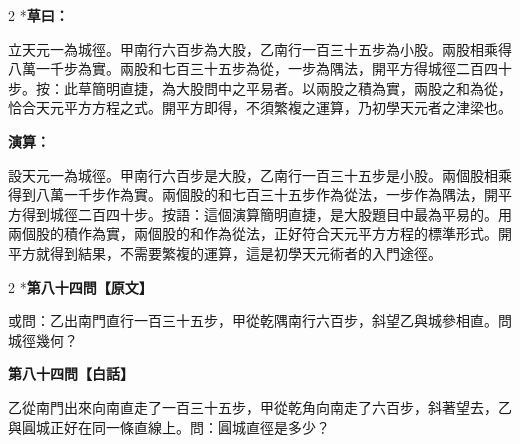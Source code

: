 \documentclass[11pt,a4paper]{article}
\begin{document}
\vspace{0.1cm}
\noindent{}
\par\vspace{0.15cm}

\begin{paracol}{2}
\switchcolumn[0]*\textbf{草曰：}

\small 立天元一為城徑。甲南行六百步為大股，乙南行一百三十五步為小股。兩股相乘得八萬一千步為實。兩股和七百三十五步為從，一步為隅法，開平方得城徑二百四十步。按：此草簡明直捷，為大股問中之平易者。以兩股之積為實，兩股之和為從，恰合天元平方方程之式。開平方即得，不須繁複之運算，乃初學天元者之津梁也。

\switchcolumn\textbf{演算：}

\small 設天元一為城徑。甲南行六百步是大股，乙南行一百三十五步是小股。兩個股相乘得到八萬一千步作為實。兩個股的和七百三十五步作為從法，一步作為隅法，開平方得到城徑二百四十步。按語：這個演算簡明直捷，是大股題目中最為平易的。用兩個股的積作為實，兩個股的和作為從法，正好符合天元平方方程的標準形式。開平方就得到結果，不需要繁複的運算，這是初學天元術者的入門途徑。
\end{paracol}

\vspace{0.1cm}
\noindent{}
\par\vspace{0.3cm}

\begin{paracol}{2}
\switchcolumn[0]*\noindent\textbf{第八十四問【原文】}

\small 或問：乙出南門直行一百三十五步，甲從乾隅南行六百步，斜望乙與城參相直。問城徑幾何？

\switchcolumn\noindent\textbf{第八十四問【白話】}

\small 乙從南門出來向南直走了一百三十五步，甲從乾角向南走了六百步，斜著望去，乙與圓城正好在同一條直線上。問：圓城直徑是多少？
\end{paracol}

\vspace{0.1cm}
\noindent{}
\par\vspace{0.15cm}
\end{document}
